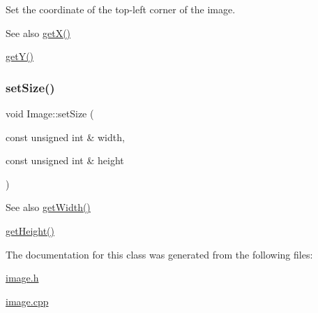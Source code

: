 Set the coordinate of the top-\/left corner of the image. 

\begin{DoxySeeAlso}{See also}
\mbox{\hyperlink{class_image_ab48c8233ee01eddacd19aa943a0a6ddc}{get\+X()}} 

\mbox{\hyperlink{class_image_a82a57f3d6ce6cef4a07bb9d4e4903ba0}{get\+Y()}} 
\end{DoxySeeAlso}
\mbox{\label{class_image_a9e801a7da9c0a032f767dbc362757349}} 
\subsubsection{\texorpdfstring{set\+Size()}{setSize()}}
{\footnotesize\ttfamily void Image\+::set\+Size (\begin{DoxyParamCaption}\item[{const unsigned int \&}]{width,  }\item[{const unsigned int \&}]{height }\end{DoxyParamCaption})}

\begin{DoxySeeAlso}{See also}
\mbox{\hyperlink{class_image_a36bcae4838228d574738249a87dc4464}{get\+Width()}} 

\mbox{\hyperlink{class_image_a1cd7587f88b6932b5269051d1ba08ff9}{get\+Height()}} 
\end{DoxySeeAlso}


The documentation for this class was generated from the following files\+:\begin{DoxyCompactItemize}
\item 
\mbox{\hyperlink{image_8h}{image.\+h}}\item 
\mbox{\hyperlink{image_8cpp}{image.\+cpp}}\end{DoxyCompactItemize}
